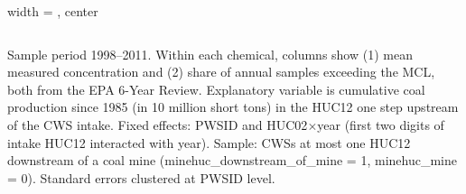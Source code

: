 \begin{table}[htbp]
\begin{adjustbox}{width = \textwidth, center}
\begin{tabular}{lcc}
         \bottomrule
         
      \end{tabular}
      
      
      
   \end{adjustbox}
      {\tiny\linespread{1}\selectfont \par \raggedright 
   Sample period 1998--2011. Within each chemical, columns show (1) mean measured concentration and (2) share of annual samples exceeding the MCL, both from the EPA 6-Year Review. Explanatory variable is cumulative coal production since 1985 (in 10 million short tons) in the HUC12 one step upstream of the CWS intake. Fixed effects: PWSID and HUC02$\times$year (first two digits of intake HUC12 interacted with year). Sample: CWSs at most one HUC12 downstream of a coal mine (minehuc\_downstream\_of\_mine = 1, minehuc\_mine = 0). Standard errors clustered at PWSID level.}
   
\end{table}


